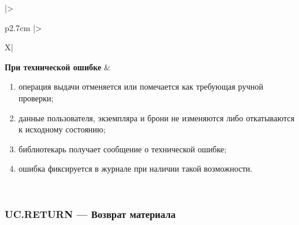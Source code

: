 \documentclass[12pt,a4paper]{article}
\begin{document}
\begin{xltabular}{\textwidth}{
				|>{\raggedright\arraybackslash}p{2.7cm}
				|>{\raggedright\arraybackslash}X|
			}
			\textbf{При технической ошибке} &
			\begin{enumerate}
				\item операция выдачи отменяется или помечается как требующая ручной
				проверки;
				\item данные пользователя, экземпляра и брони не изменяются либо
				откатываются к исходному состоянию;
				\item библиотекарь получает сообщение о технической ошибке;
				\item ошибка фиксируется в журнале при наличии такой возможности.
			\end{enumerate} \\
			\hline
			
		\end{xltabular}
		
		\label{tab:uc-loan-specification}
		
		\clearpage
		\subsubsection{UC.RETURN --- Возврат материала}
		
\end{document}
